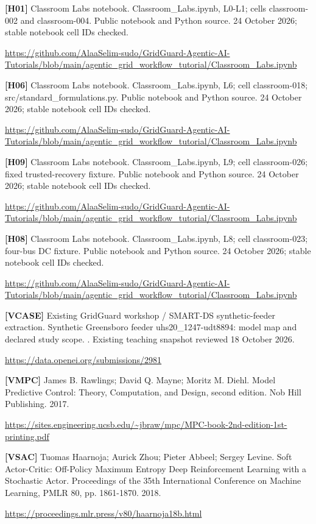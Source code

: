 \documentclass[12pt,letterpaper]{article}
\begin{document}
{\textbf{[H01]} Classroom Labs notebook. Classroom\_\allowbreak{}Labs.ipynb, L0-L1; cells classroom-002 and classroom-004. Public notebook and Python source. 24 October 2026; stable notebook cell IDs checked.\par\url{https://github.com/AlaaSelim-sudo/GridGuard-Agentic-AI-Tutorials/blob/main/agentic_grid_workflow_tutorial/Classroom_Labs.ipynb}\par\medskip
\textbf{[H06]} Classroom Labs notebook. Classroom\_\allowbreak{}Labs.ipynb, L6; cell classroom-018; src/\allowbreak{}standard\_\allowbreak{}formulations.py. Public notebook and Python source. 24 October 2026; stable notebook cell IDs checked.\par\url{https://github.com/AlaaSelim-sudo/GridGuard-Agentic-AI-Tutorials/blob/main/agentic_grid_workflow_tutorial/Classroom_Labs.ipynb}\par\medskip
\textbf{[H09]} Classroom Labs notebook. Classroom\_\allowbreak{}Labs.ipynb, L9; cell classroom-026; fixed trusted-recovery fixture. Public notebook and Python source. 24 October 2026; stable notebook cell IDs checked.\par\url{https://github.com/AlaaSelim-sudo/GridGuard-Agentic-AI-Tutorials/blob/main/agentic_grid_workflow_tutorial/Classroom_Labs.ipynb}\par\medskip
\textbf{[H08]} Classroom Labs notebook. Classroom\_\allowbreak{}Labs.ipynb, L8; cell classroom-023; four-bus DC fixture. Public notebook and Python source. 24 October 2026; stable notebook cell IDs checked.\par\url{https://github.com/AlaaSelim-sudo/GridGuard-Agentic-AI-Tutorials/blob/main/agentic_grid_workflow_tutorial/Classroom_Labs.ipynb}\par\medskip
\textbf{[VCASE]} Existing GridGuard workshop /\allowbreak{} SMART-DS synthetic-feeder extraction. Synthetic Greensboro feeder uhs20\_\allowbreak{}1247-udt8894: model map and declared study scope. . Existing teaching snapshot reviewed 18 October 2026.\par\url{https://data.openei.org/submissions/2981}\par\medskip
\textbf{[VMPC]} James B. Rawlings; David Q. Mayne; Moritz M. Diehl. Model Predictive Control: Theory, Computation, and Design, second edition. Nob Hill Publishing. 2017.\par\url{https://sites.engineering.ucsb.edu/~jbraw/mpc/MPC-book-2nd-edition-1st-printing.pdf}\par\medskip
\textbf{[VSAC]} Tuomas Haarnoja; Aurick Zhou; Pieter Abbeel; Sergey Levine. Soft Actor-Critic: Off-Policy Maximum Entropy Deep Reinforcement Learning with a Stochastic Actor. Proceedings of the 35th International Conference on Machine Learning, PMLR 80, pp. 1861-1870. 2018.\par\url{https://proceedings.mlr.press/v80/haarnoja18b.html}\par\medskip
}
\end{document}
